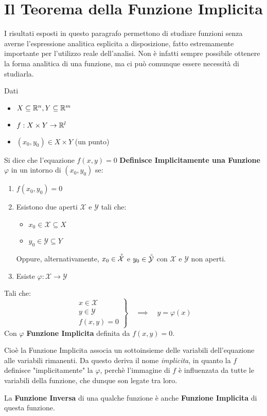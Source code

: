 \section{Il Teorema della Funzione Implicita}
I risultati esposti in questo paragrafo permettono di studiare funzioni senza averne l'espressione analitica esplicita a disposizione, fatto estremamente importante per l'utilizzo reale dell'analisi. Non è infatti sempre possibile ottenere la forma analitica di una funzione, ma ci può comunque essere necessità di studiarla.
\begin{definition}
	\label{def:funz_impl}
	Dati
	\begin{itemize}[noitemsep]
		\item $X \subseteq \mathbb{R}^n, Y \subseteq \mathbb{R}^m$
		\item $f: X \times Y \to \mathbb{R}^l$
		\item $(x_0, y_0) \in X \times Y$ (un punto)
	\end{itemize}
	Si dice che l'equazione $f(x,y) = 0$ \textbf{Definisce Implicitamente una Funzione} $\varphi$ in un intorno di $(x_0,y_0)$ se:
	\begin{enumerate}
		\item $f(x_0,y_0) = 0$
		\item Esistono due aperti $\mathcal{X}$ e $\mathcal{Y}$ tali che:
			\begin{itemize}[noitemsep, topsep=0pt]
				\item $x_0 \in \mathcal{X} \subseteq X$
				\item $y_0 \in \mathcal{Y} \subseteq Y$
			\end{itemize}
			\begin{note}
				Oppure, alternativamente, $x_0 \in \accentset{\circ}{\mathcal{X}}$ e $y_0 \in \accentset{\circ}{\mathcal{Y}}$ con $\mathcal{X}$ e $\mathcal{Y}$ non aperti.
			\end{note}\vspace*{-2ex}
		\item Esiste $\varphi: \mathcal{X} \to \mathcal{Y}$
	\end{enumerate}
	Tali che:
	\[
		\left.
		\begin{array}{l}
			x \in \mathcal{X}\\
			y \in \mathcal{Y}\\
			f(x,y) = 0
		\end{array}
		\right\}
		\quad \implies \quad
		y = \varphi(x)
	\]
	Con $\varphi$ \textbf{Funzione Implicita} definita da $f(x,y)=0$.

	\vspace*{\baselineskip}
	Cioè la Funzione Implicita associa un sottoinsieme delle variabili dell'equazione alle variabili rimanenti. Da questo deriva il nome \textit{implicita}, in quanto la $f$ definisce "implicitamente" la $\varphi$, perchè l'immagine di $f$ è influenzata da tutte le variabili della funzione, che dunque son legate tra loro.
	\begin{note}
		La \textbf{Funzione Inversa} di una qualche funzione è anche \textbf{Funzione Implicita} di questa funzione.
	\end{note}
\end{definition}
